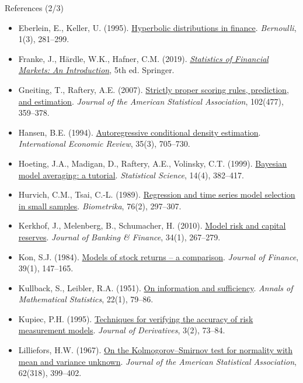 \begin{frame}{References (2/3)}
\itemsize{\tiny}
\begin{itemize}
    \item Eberlein, E., Keller, U. (1995). \href{https://doi.org/10.2307/3318481}{Hyperbolic distributions in finance}. \textit{Bernoulli}, 1(3), 281--299.
    \item Franke, J., Härdle, W.K., Hafner, C.M. (2019). \href{https://doi.org/10.1007/978-3-030-13751-9}{\textit{Statistics of Financial Markets: An Introduction}}, 5th ed. Springer.
    \item Gneiting, T., Raftery, A.E. (2007). \href{https://doi.org/10.1198/016214506000001437}{Strictly proper scoring rules, prediction, and estimation}. \textit{Journal of the American Statistical Association}, 102(477), 359--378.
    \item Hansen, B.E. (1994). \href{https://doi.org/10.2307/2527081}{Autoregressive conditional density estimation}. \textit{International Economic Review}, 35(3), 705--730.
    \item Hoeting, J.A., Madigan, D., Raftery, A.E., Volinsky, C.T. (1999). \href{https://doi.org/10.1214/ss/1009212519}{Bayesian model averaging: a tutorial}. \textit{Statistical Science}, 14(4), 382--417.
    \item Hurvich, C.M., Tsai, C.-L. (1989). \href{https://doi.org/10.1093/biomet/76.2.297}{Regression and time series model selection in small samples}. \textit{Biometrika}, 76(2), 297--307.
    \item Kerkhof, J., Melenberg, B., Schumacher, H. (2010). \href{https://doi.org/10.1016/j.jbankfin.2009.07.025}{Model risk and capital reserves}. \textit{Journal of Banking \& Finance}, 34(1), 267--279.
    \item Kon, S.J. (1984). \href{https://doi.org/10.1111/j.1540-6261.1984.tb03865.x}{Models of stock returns -- a comparison}. \textit{Journal of Finance}, 39(1), 147--165.
    \item Kullback, S., Leibler, R.A. (1951). \href{https://doi.org/10.1214/aoms/1177729694}{On information and sufficiency}. \textit{Annals of Mathematical Statistics}, 22(1), 79--86.
    \item Kupiec, P.H. (1995). \href{https://doi.org/10.3905/jod.1995.407942}{Techniques for verifying the accuracy of risk measurement models}. \textit{Journal of Derivatives}, 3(2), 73--84.
    \item Lilliefors, H.W. (1967). \href{https://doi.org/10.1080/01621459.1967.10482916}{On the Kolmogorov--Smirnov test for normality with mean and variance unknown}. \textit{Journal of the American Statistical Association}, 62(318), 399--402.

\end{itemize}
\end{frame}
